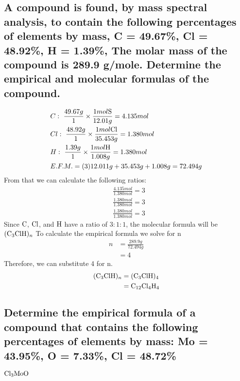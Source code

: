 \documentclass[11pt]{article}
\begin{document}
\subsection{A compound is found, by mass spectral analysis, to contain the following percentages of elements by mass, C = 49.67\%, Cl = 48.92\%, H = 1.39\%, The molar mass of the compound is 289.9 g/mole. Determine the empirical and molecular formulas of the compound.}
\label{sec:orge712247}
\begin{align*}
&C:\ \frac{49.67g}{1}\times\frac{1mol\ce{S}}{12.01g}=4.135mol\\
&Cl:\ \frac{48.92g}{1}\times\frac{1mol\ce{Cl}}{35.453g}=1.380mol\\
&H:\ \frac{1.39g}{1}\times\frac{1mol\ce{H}}{1.008g}=1.380mol\\
&E.F.M.=(3)12.011g+35.453g+1.008g=72.494g
\end{align*}
From that we can calculate the following ratios:
\begin{align*}
&\frac{4.135mol}{1.380mol}=3\\
&\frac{1.380mol}{1.380mol}=3\\
&\frac{1.380mol}{1.380mol}=3
\end{align*}
Since \(\ce{C}\), \(\ce{Cl}\), and  \(\ce{H}\) have a ratio of \(3:1:1\), the molecular formula will be \(\ce{(C3ClH)_n}\) To calculate the empirical formula we solve for n
\begin{align*}
n&=\frac{289.9g}{72.494g}\\
&=4
\end{align*}
Therefore, we can substitute 4 for n.
\begin{align*}
\ce{(C3ClH)_n}&=\ce{(C3ClH)4}\\
&=\ce{C12Cl4H4}
\end{align*}

\subsection{Determine the empirical formula of a compound that contains the following percentages of elements by mass: Mo = 43.95\%, O = 7.33\%, Cl = 48.72\%}
\label{sec:org20c7c28}
\(\ce{Cl3MoO}\)
\end{document}
